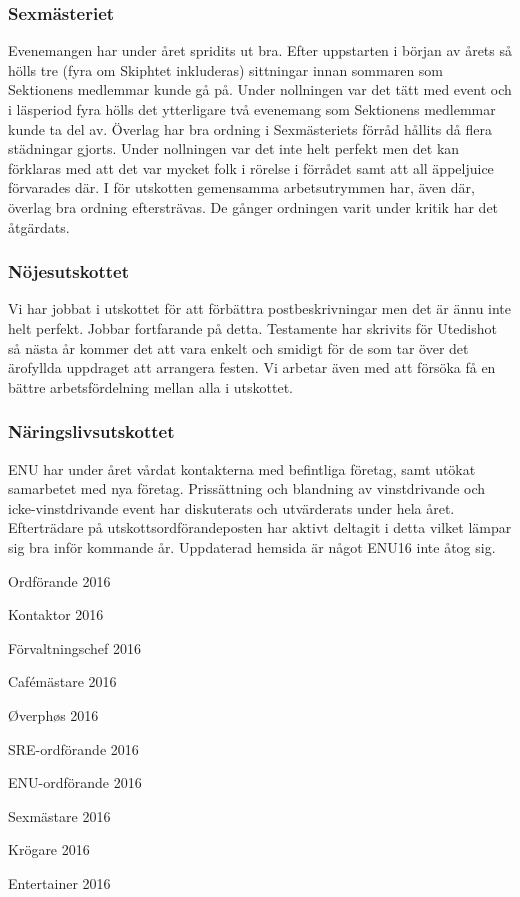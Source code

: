 \documentclass[../_main/handlingar.tex]{subfiles}
\begin{document}
\subsubsection*{Sexmästeriet}
Evenemangen har under året spridits ut bra. Efter uppstarten i början av årets så hölls tre (fyra om Skiphtet inkluderas) sittningar innan sommaren som Sektionens medlemmar kunde gå på. Under nollningen var det tätt med event och i läsperiod fyra hölls det ytterligare två evenemang som Sektionens medlemmar kunde ta del av. Överlag har bra ordning i Sexmästeriets förråd hållits då flera städningar gjorts. Under nollningen var det inte helt perfekt men det kan förklaras med att det var mycket folk i rörelse i förrådet samt att all äppeljuice förvarades där. I för utskotten gemensamma arbetsutrymmen har, även där, överlag bra ordning eftersträvas. De gånger ordningen varit under kritik har det åtgärdats.

\subsubsection*{Nöjesutskottet}
Vi har jobbat i utskottet för att förbättra postbeskrivningar men det är ännu inte helt perfekt. Jobbar fortfarande på detta. Testamente har skrivits för Utedishot så nästa år kommer det att vara enkelt och smidigt för de som tar över det ärofyllda uppdraget att arrangera festen. Vi arbetar även med att försöka få en bättre arbetsfördelning mellan alla i utskottet.


\subsubsection*{Näringslivsutskottet}
ENU har under året vårdat kontakterna med befintliga företag, samt utökat samarbetet med nya företag. Prissättning och blandning av vinstdrivande och icke-vinstdrivande event har diskuterats och utvärderats under hela året. Efterträdare på utskottsordförandeposten har aktivt deltagit i detta vilket lämpar sig bra inför kommande år. Uppdaterad hemsida är något ENU16 inte åtog sig.

\newpage
\begin{signatures}{10}
    \mvh
    \signature{Fredrik Peterson}{Ordförande 2016}
    \signature{Erik Månsson}{Kontaktor 2016}
    \signature{Anders Nilsson}{Förvaltningschef 2016}
    \signature{Stephanie Mirsky}{Cafémästare 2016}
    \signature{Molly Rusk}{Øverphøs 2016}
    \signature{Johan Persson}{SRE-ordförande 2016}
    \signature{Johannes Koch}{ENU-ordförande 2016}
    \signature{Martin Gemborn Nilsson}{Sexmästare 2016}
    \signature{Malin Lindström}{Krögare 2016}
    \signature{Dalia Khairallah}{Entertainer 2016}
\end{signatures}
\end{document}
